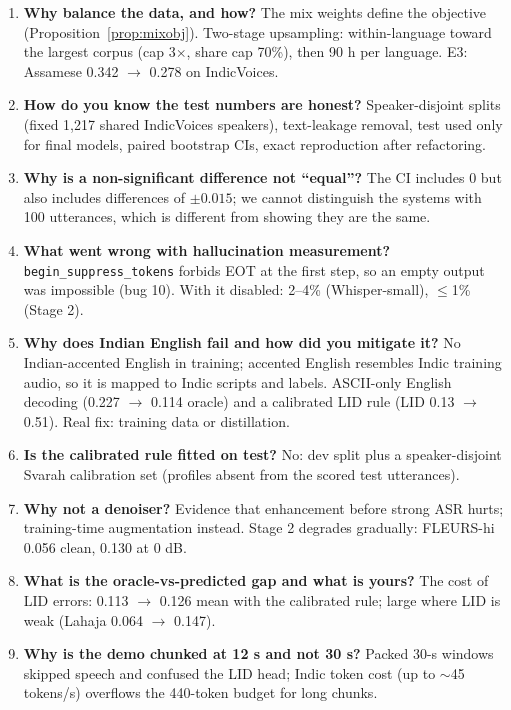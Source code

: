 \begin{enumerate}[leftmargin=*,label=\textbf{Q\arabic*.}]
\item \textbf{Why balance the data, and how?} The mix weights define the objective (Proposition~\ref{prop:mixobj}). Two-stage
upsampling: within-language toward the largest corpus (cap 3$\times$, share cap 70\%), then 90 h per language. E3: Assamese 0.342
$\to$ 0.278 on IndicVoices.

\item \textbf{How do you know the test numbers are honest?} Speaker-disjoint splits (fixed 1{,}217 shared IndicVoices speakers),
text-leakage removal, test used only for final models, paired bootstrap CIs, exact reproduction after refactoring.

\item \textbf{Why is a non-significant difference not ``equal''?} The CI includes 0 but also includes differences of $\pm0.015$; we
cannot distinguish the systems with 100 utterances, which is different from showing they are the same.

\item \textbf{What went wrong with hallucination measurement?} \texttt{begin\_suppress\_tokens} forbids EOT at the first step, so an
empty output was impossible (bug 10). With it disabled: 2--4\% (Whisper-small), $\le$1\% (Stage 2).

\item \textbf{Why does Indian English fail and how did you mitigate it?} No Indian-accented English in training; accented English
resembles Indic training audio, so it is mapped to Indic scripts and labels. ASCII-only English decoding (0.227 $\to$ 0.114 oracle) and
a calibrated LID rule (LID 0.13 $\to$ 0.51). Real fix: training data or distillation.

\item \textbf{Is the calibrated rule fitted on test?} No: dev split plus a speaker-disjoint Svarah calibration set (profiles absent from
the scored test utterances).

\item \textbf{Why not a denoiser?} Evidence that enhancement before strong ASR hurts; training-time augmentation instead. Stage 2
degrades gradually: FLEURS-hi 0.056 clean, 0.130 at 0 dB.

\item \textbf{What is the oracle-vs-predicted gap and what is yours?} The cost of LID errors: 0.113 $\to$ 0.126 mean with the
calibrated rule; large where LID is weak (Lahaja 0.064 $\to$ 0.147).

\item \textbf{Why is the demo chunked at 12 s and not 30 s?} Packed 30-s windows skipped speech and confused the LID head; Indic token
cost (up to $\sim$45 tokens/s) overflows the 440-token budget for long chunks.


\end{enumerate}
